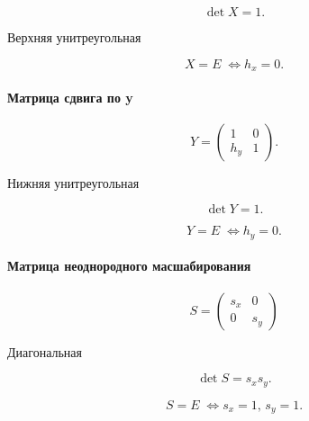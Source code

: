 $$\det X = 1.$$

Верхняя унитреугольная

$$X = E\; \Leftrightarrow h_x = 0.$$


\paragraph{Матрица сдвига по y}
$$
Y = \begin{pmatrix}
	1 & 0 \\
	h_y & 1
\end{pmatrix}.
$$

Нижняя унитреугольная

$$\det Y = 1.$$

$$Y = E\; \Leftrightarrow h_y = 0.$$


\paragraph{Матрица неоднородного масшабирования}
$$S=
\begin{pmatrix}
	s_x & 0 \\
	0 & s_y
\end{pmatrix}
$$

Диагональная

$$\det S = s_x s_y.$$

$$S = E\; \Leftrightarrow s_x = 1,\,s_y=1.$$

